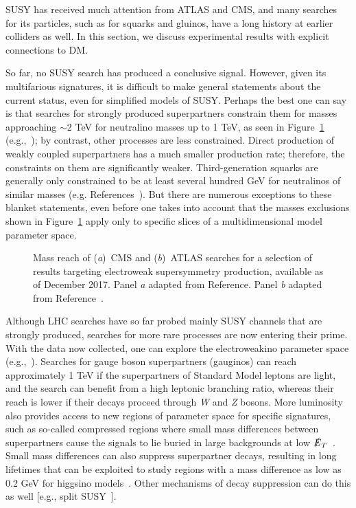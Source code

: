 \documentclass{ar-1col}
\newcommand{\MET}{\ensuremath{\slashed{E}_T}\xspace}
\begin{document}
SUSY has received much attention from ATLAS and CMS, and many
searches for its particles, such as for squarks and gluinos, have
a long history at earlier colliders as well. In this section, we
discuss experimental results with explicit connections to DM.

So far, no SUSY search has produced a conclusive signal. However,
given its multifarious signatures, it is difficult to make general
statements about the current status, even for simplified models of
SUSY. Perhaps the best one can say is that searches for
strongly produced superpartners constrain them for masses
approaching $\sim$2 TeV for neutralino masses up to 1 TeV, as seen in Figure~\ref{fig:SUSYSummary_ew}
(e.g.,~); by contrast, other processes are
less constrained. Direct production of weakly coupled
superpartners has a much smaller production rate; therefore, the
constraints on them are significantly weaker. Third-generation
squarks are generally only constrained to be at least several
hundred GeV for neutralinos of similar masses (e.g. References~). But there are
numerous exceptions to these blanket statements, even before one
takes into account that the masses exclusions shown in Figure~\ref{fig:SUSYSummary_ew} 
apply only to specific slices of a multidimensional model parameter
space.

\begin{figure}[!htpb]
\caption{Mass reach of (\textit{a})\ CMS and (\textit{b})\ ATLAS searches for a selection of
results targeting electroweak supersymmetry production, available as of
December 2017.
Panel \textit{a} adapted from Reference. Panel \textit{b} adapted from Reference~.\label{fig:SUSYSummary_ew}}
\end{figure}

Although LHC searches have so far probed mainly  SUSY channels that are strongly produced, searches for more rare processes are now entering their prime. With the data now collected, one can explore the
electroweakino parameter space (e.g.,~). Searches for gauge
boson superpartners (gauginos) can reach approximately 1 TeV if
the superpartners of Standard Model leptons are light, and the search can
benefit from a high leptonic branching ratio, whereas their reach
is lower if their decays proceed through \textit{W} and \textit{Z} bosons. More
luminosity also provides access to new regions of parameter space
for specific signatures, such as so-called compressed regions where small
mass differences between superpartners cause the signals to lie
buried in large backgrounds at low
\MET~\cite{Aaboud:2017leg,Sirunyan:2017zss}. Small mass
differences can also suppress superpartner decays, resulting in
long lifetimes that can be exploited to study regions with a mass
difference as low as 0.2 GeV for higgsino models~\cite{ATL-PHYS-PUB-2017-019}. Other mechanisms of decay
suppression can do this as well [e.g., split
SUSY~\cite{Sirunyan:2018vjp}].
\end{document}
